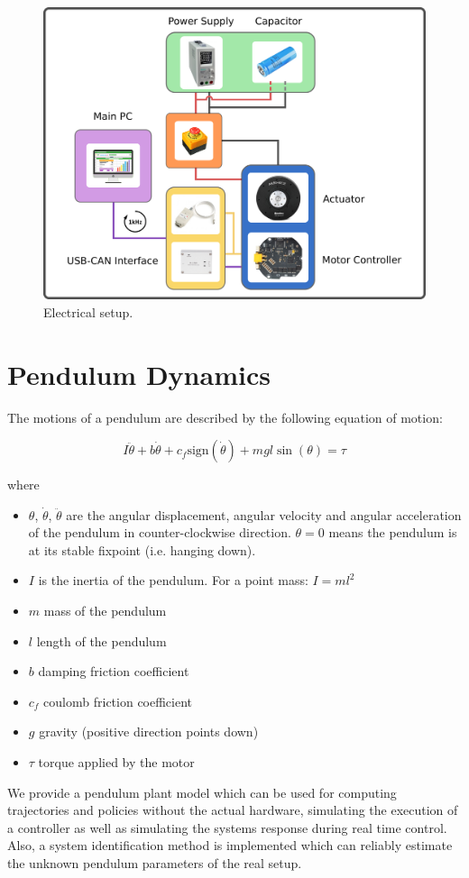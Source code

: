 \documentclass[onecolumn, letter paper]{report}
\begin{document}
\begin{figure}[H]
    \centering
    \includegraphics[width=0.4\linewidth]{figures/wiring_diagram.png}
    \caption{Electrical setup.}
    \label{fig:electrical_schematic}
\end{figure}

\chapter{Pendulum Dynamics}
The motions of a pendulum are described by the following equation of motion:

\begin{equation}
    I\ddot{\theta} + b\dot{\theta} + c_f \text{sign}(\dot{\theta}) + mgl \sin(\theta) = \tau
    \label{eq:eom}
\end{equation}

where

\begin{itemize}
    \item $\theta$, $\dot{\theta}$, $\ddot{\theta}$ are the angular displacement, angular velocity and angular acceleration of the pendulum in counter-clockwise direction. $\theta=0$ means the pendulum is at its stable fixpoint (i.e. hanging down).
    \item $I$ is the inertia of the pendulum. For a point mass: $I=ml^2$
    \item $m$ mass of the pendulum
    \item $l$ length of the pendulum
    \item $b$ damping friction coefficient
    \item $c_f$ coulomb friction coefficient
    \item $g$ gravity (positive direction points down)
    \item $\tau$ torque applied by the motor
\end{itemize}

We provide a pendulum plant model which can be used for computing trajectories and policies without the actual hardware, simulating the execution of a controller as well as simulating the systems response during real time control. Also, a system identification method is implemented which can reliably estimate the unknown pendulum parameters of the real setup.
\end{document}
